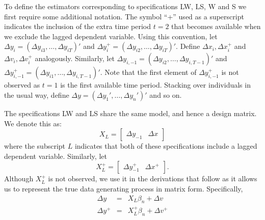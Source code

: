 To define the estimators corresponding to specifications LW, LS, W and S we first require some additional notation. The symbol ``+'' used as a superscript indicates the inclusion of the extra time period $t=2$ that becomes available when we exclude the lagged dependent variable.
Using this convention, let $\Delta y_i = \left( \Delta y_{i3}, \hdots, \Delta y_{iT} \right)'$ and  $\Delta y_i^+ = \left( \Delta y_{i2},  \hdots, \Delta y_{iT} \right)'$.
Define $\Delta x_i, \Delta x_i^+$ and $\Delta v_i, \Delta v_i^+$ analogously. 
Similarly, let $\Delta y_{i,-1}=\left(\Delta y_{i2}, \hdots, \Delta y_{i,T-1}\right)'$ and $\Delta y_{i,-1}^+=\left(\Delta y_{i1}, \hdots, \Delta y_{i,T-1}\right)'$.
Note that the first element of $\Delta y_{i,-1}^+$ is not observed as $t=1$ is the first available time period. 
Stacking over individuals in the usual way, define $\Delta y = \left( \Delta y_1', \hdots, \Delta y_n'\right)'$  and so on.

The specifications LW and LS share the same model, and hence a design matrix. We denote this as:
	\begin{equation}
	X_L = \left[\begin{array}{cc}  \Delta y_{-1} & \Delta x \end{array}\right]
	\end{equation}
where the subscript $L$ indicates that both of these specifications include a lagged dependent variable.
Similarly, let
\begin{equation}
	X_L^+ = \left[ \begin{array}{cc}\Delta y_{-1}^+ & \Delta x^+ \end{array} \right].
\end{equation}
Although $X_L^+$ is not observed, we use it in the derivations that follow as it allows us to represent the true data generating process in matrix form.
Specifically, 
	\begin{eqnarray}
	\label{eq:DGP}
		\Delta y &=& X_L \beta_n + \Delta v\\
		\label{eq:DGPplus}
		\Delta y^+ &=& X_L^+ \beta_n + \Delta v^+
	\end{eqnarray}

